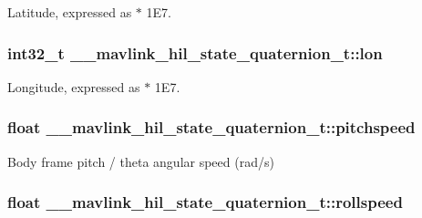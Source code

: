 Latitude, expressed as $\ast$ 1\+E7. 

\hypertarget{struct____mavlink__hil__state__quaternion__t_a345f022044f481073ea518e0ac65218a}{
\subsubsection[{lon}]{\setlength{\rightskip}{0pt plus 5cm}int32\+\_\+t \+\_\+\+\_\+mavlink\+\_\+hil\+\_\+state\+\_\+quaternion\+\_\+t\+::lon}}\label{struct____mavlink__hil__state__quaternion__t_a345f022044f481073ea518e0ac65218a}


Longitude, expressed as $\ast$ 1\+E7. 

\hypertarget{struct____mavlink__hil__state__quaternion__t_a68900f55507fd4fb1dfcf1687fb292ed}{
\subsubsection[{pitchspeed}]{\setlength{\rightskip}{0pt plus 5cm}float \+\_\+\+\_\+mavlink\+\_\+hil\+\_\+state\+\_\+quaternion\+\_\+t\+::pitchspeed}}\label{struct____mavlink__hil__state__quaternion__t_a68900f55507fd4fb1dfcf1687fb292ed}


Body frame pitch / theta angular speed (rad/s) 

\hypertarget{struct____mavlink__hil__state__quaternion__t_a83042286abfe3545cabe2d4e5a087f12}{
\subsubsection[{rollspeed}]{\setlength{\rightskip}{0pt plus 5cm}float \+\_\+\+\_\+mavlink\+\_\+hil\+\_\+state\+\_\+quaternion\+\_\+t\+::rollspeed}}\label{struct____mavlink__hil__state__quaternion__t_a83042286abfe3545cabe2d4e5a087f12}


